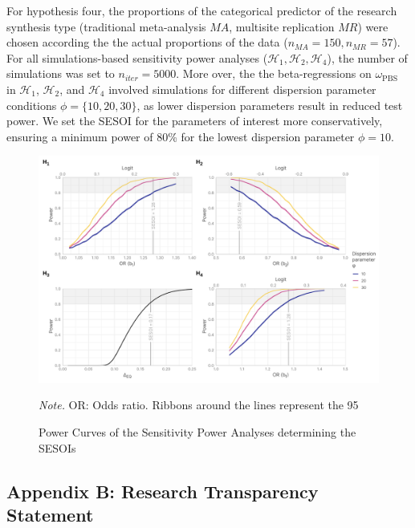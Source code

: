\documentclass[
  12pt,
]{scrartcl}
\newcommand{\pbs}{\omega_{\text{PBS}}}
\begin{document}
For hypothesis four, the proportions of the categorical predictor of the
research synthesis type (traditional meta-analysis \(MA\), multisite
replication \(MR\)) were chosen according the the actual proportions of
the data (\(n_{MA}=150, n_{MR}=57\)). For all simulations-based
sensitivity power analyses
(\(\mathcal{H}_1, \mathcal{H}_2, \mathcal{H}_4\)), the number of
simulations was set to \(n_{iter}=5000\). More over, the the
beta-regressions on \(\pbs\) in \(\mathcal{H}_1\), \(\mathcal{H}_2\),
and \(\mathcal{H}_4\) involved simulations for different dispersion
parameter conditions \(\phi = \{10, 20, 30\}\), as lower dispersion
parameters result in reduced test power. We set the SESOI for the
parameters of interest more conservatively, ensuring a minimum power of
80\% for the lowest dispersion parameter \(\phi = 10\).

\begin{figure}[H]
\caption{Power Curves of the Sensitivity Power Analyses determining the SESOIs
\label{fig:sesoi}}

\begin{center}
\includegraphics[width=1\textwidth,height=\textheight]{../figures/power_sesoi.png}
\end{center}

\begingroup
\scriptsize
\textit{Note.} OR: Odds ratio. Ribbons around the lines represent the 95\\%
\endgroup
\end{figure}

\subsection{Appendix B: Research Transparency
Statement}\label{appendix-b-research-transparency-statement}
\end{document}
